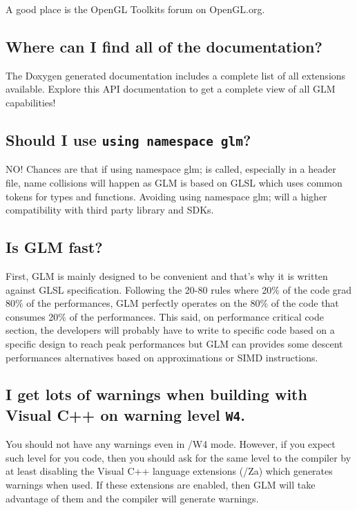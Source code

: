 \documentclass{scrartcl}
\numberwithin{figure}{subsection}
\begin{document}
A good place is the OpenGL Toolkits forum on OpenGL.org.

\subsection{Where can I find all of the documentation?}

The Doxygen generated documentation includes a complete list of all extensions available. Explore this API documentation to get a complete view of all GLM capabilities!

\subsection{Should I use \texttt{using namespace glm}?}

NO! Chances are that if using namespace glm; is called, especially in a header file, name collisions will happen as GLM is based on GLSL which uses common tokens for types and functions. Avoiding using namespace glm; will a higher compatibility with third party library and SDKs.

\subsection{Is GLM fast?}

First, GLM is mainly designed to be convenient and that's why it is written against GLSL specification. Following the 20-80 rules where 20\% of the code grad 80\% of the performances, GLM perfectly operates on the 80\% of the code that consumes 20\% of the performances. This said, on performance critical code section, the developers will probably have to write to specific code based on a specific design to reach peak performances but GLM can provides some descent performances alternatives based on approximations or SIMD instructions.

\subsection{I get lots of warnings when building with Visual C++ on warning level \texttt{\/W4}.}

You should not have any warnings even in /W4 mode. However, if you expect such level for you code, then you should ask for the same level to the compiler by at least disabling the Visual C++ language extensions (/Za) which generates warnings when used. If these extensions are enabled, then GLM will take advantage of them and the compiler will generate warnings.
\end{document}
